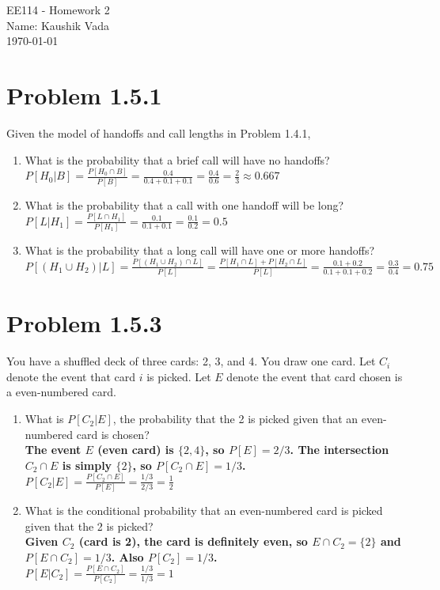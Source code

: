 \documentclass{article}
\begin{document}
\begin{center}
    {\LARGE EE114 - Homework 2} \\[0.5cm]
    Name: Kaushik Vada \\[0.5cm]
    \today
\end{center}

\section*{Problem 1.5.1}
Given the model of handoffs and call lengths in Problem 1.4.1,
\begin{enumerate}[label=(\alph*)]
    \item What is the probability that a brief call will have no handoffs? \\[1em]
    {\boldmath\textbf{$P[H_0 | B] = \frac{P[H_0 \cap B]}{P[B]} = \frac{0.4}{0.4 + 0.1 + 0.1} = \frac{0.4}{0.6} = \frac{2}{3} \approx 0.667$}}

    \item What is the probability that a call with one handoff will be long? \\[1em]
    {\boldmath\textbf{$P[L | H_1] = \frac{P[L \cap H_1]}{P[H_1]} = \frac{0.1}{0.1 + 0.1} = \frac{0.1}{0.2} = 0.5$}}

    \item What is the probability that a long call will have one or more handoffs? \\[1em]
    {\boldmath\textbf{$P[(H_1 \cup H_2) | L] = \frac{P[(H_1 \cup H_2) \cap L]}{P[L]} = \frac{P[H_1 \cap L] + P[H_2 \cap L]}{P[L]} = \frac{0.1 + 0.2}{0.1 + 0.1 + 0.2} = \frac{0.3}{0.4} = 0.75$}}
\end{enumerate}

\section*{Problem 1.5.3}
You have a shuffled deck of three cards: 2, 3, and 4. You draw one card. Let $C_i$ denote the event that card $i$ is picked. Let $E$ denote the event that card chosen is a even-numbered card.
\begin{enumerate}[label=(\alph*)]
    \item What is $P[C_2|E]$, the probability that the 2 is picked given that an even-numbered card is chosen? \\[1em]
    {\boldmath\textbf{The event $E$ (even card) is $\{2, 4\}$, so $P[E] = 2/3$. The intersection $C_2 \cap E$ is simply $\{2\}$, so $P[C_2 \cap E] = 1/3$.}} \\
    {\boldmath\textbf{$P[C_2|E] = \frac{P[C_2 \cap E]}{P[E]} = \frac{1/3}{2/3} = \frac{1}{2}$}}

    \item What is the conditional probability that an even-numbered card is picked given that the 2 is picked? \\[1em]
    {\boldmath\textbf{Given $C_2$ (card is 2), the card is definitely even, so $E \cap C_2 = \{2\}$ and $P[E \cap C_2] = 1/3$. Also $P[C_2] = 1/3$.}} \\
    {\boldmath\textbf{$P[E|C_2] = \frac{P[E \cap C_2]}{P[C_2]} = \frac{1/3}{1/3} = 1$}}
\end{enumerate}
\end{document}
